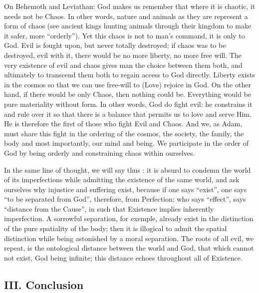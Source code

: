 On Behemoth and Leviathan: God makes us remember that where it is chaotic, it needs not be Chaos. In other words, nature and animals as they are represent a form of chaos (see ancient kings hunting animals through their kingdom to make it safer, more ``orderly”). Yet this chaos is not to man's command, it is only to God. Evil is fought upon, but never totally destroyed; if chaos was to be destroyed, evil with it, there would be no more liberty, no more free will. The very existence of evil and chaos gives man the choice between them both, and ultimately to transcend them both to regain access to God directly. Liberty exists in the cosmos so that we can use free-will to (Love) rejoice in God. On the other hand, if there would be only Chaos, then nothing could be. Everything would be pure materiality without form. In other words, God do fight evil: he constrains it and rule over it so that there is a balance that permits us to love and serve Him. He is therefore the first of those who fight Evil and Chaos. And we, as Adam, must share this fight in the ordering of the cosmos, the society, the family, the body and most importantly, our mind and being. We participate in the order of God by being orderly and constraining chaos within ourselves.

\begin{quotex}
In the same line of thought, we will say thus : it is absurd to condemn the world of its imperfections while admitting the existence of the same world, and ask ourselves why injustice and suffering exist, because if one says ``exist”, one says ``to be separated from God”, therefore, from Perfection; who says ``effect”, says ``distance from the Cause”, in such that Existence implies inherently imperfection. A sorrowful separation, for exemple, already exist in the distinction of the pure spatiality of the body; then it is illogical to admit the spatial distinction while being astonished by a moral separation. The roots of all evil, we repeat, is the ontological distance between the world and God, that which cannot not exist, God being infinite; this distance echoes throughout all of Existence.

\end{quotex}


\subsection*{III. Conclusion}


